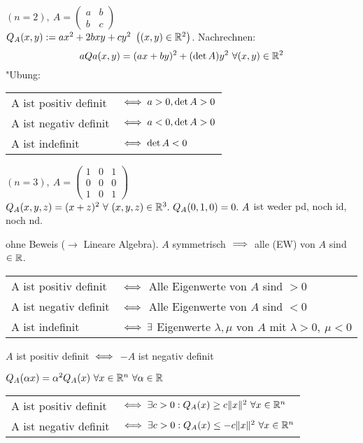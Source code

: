 \documentclass[a4paper,twoside,DIV15,BCOR12mm]{scrbook}
\begin{document}
\begin{beispiele}
\item $(n=2),\ A=\left(\begin{smallmatrix}a&b\\b&c\end{smallmatrix}\right)$\\
$Q_A(x,y):=ax^2+2bxy+cy^2\ \left((x,y)\in\MdR^2\right)$. Nachrechnen:\\
$$aQa(x,y)=(ax+by)^2+(\det A)y^2\ \forall (x,y)\in\mathbb{R}^2$$ "Ubung:\\
\begin{tabular}{ll}
A ist positiv definit & $\iff a>0, \det A>0$\\
A ist negativ definit & $\iff a<0, \det A>0$\\
A ist indefinit& $\iff \det A<0$
\end{tabular}
\item $(n=3),\ A=\left(\begin{smallmatrix}1&0&1\\0&0&0\\1&0&1\end{smallmatrix}\right)$\\
$Q_A(x,y,z)=(x+z)^2\ \forall\ (x,y,z)\in\MdR^3.\ Q_A(0,1,0)=0.\ A$ ist weder pd, noch id, noch nd.
\item ohne Beweis ($\to$ Lineare Algebra). $A$ symmetrisch $\implies$ alle  (EW) von $A$ sind $\in\mathbb{R}$.\\
\begin{tabular}{ll}
A ist positiv definit & $\iff$ Alle Eigenwerte von $A$ sind $>0$\\
A ist negativ definit & $\iff$ Alle Eigenwerte von $A$ sind $<0$\\
A ist indefinit& $\iff \exists$ Eigenwerte $\lambda, \mu$ von $A$ mit $\lambda>0,\ \mu<0$
\end{tabular}
\end{beispiele}

\begin{satz}
\begin{liste}
\item $A$ ist positiv definit $\iff$ $-A$ ist negativ definit
\item $Q_A(\alpha x)=\alpha^2Q_A(x)\ \forall x\in\mathbb{R}^n\ \forall \alpha\in\mathbb{R}$
\item \begin{tabular}{ll}
A ist positiv definit & $\iff \exists c>0: Q_A(x)\ge c\|x\|^2\ \forall x\in\mathbb{R}^n$\\
A ist negativ definit & $\iff \exists c>0: Q_A(x)\le -c\|x\|^2\ \forall x\in\mathbb{R}^n$
\end{tabular}
\end{liste}
\end{satz}
\end{document}
